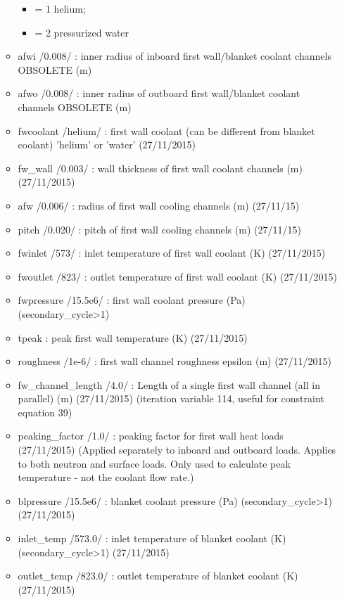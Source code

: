 \documentclass[
]{article}
\providecommand{\tightlist}{%
  \setlength{\itemsep}{0pt}\setlength{\parskip}{0pt}}
\begin{document}
\begin{itemize}
\begin{itemize}
    \begin{itemize}
    \tightlist
    \item
      = 1 helium;
    \item
      = 2 pressurized water
    \end{itemize}
  \item
    afwi /0.008/ : inner radius of inboard first wall/blanket coolant
    channels OBSOLETE (m)
  \item
    afwo /0.008/ : inner radius of outboard first wall/blanket coolant
    channels OBSOLETE (m)
  \item
    fwcoolant /helium/ : first wall coolant (can be different from
    blanket coolant) 'helium' or 'water' (27/11/2015)
  \item
    fw\_wall /0.003/ : wall thickness of first wall coolant channels (m)
    (27/11/2015)
  \item
    afw /0.006/ : radius of first wall cooling channels (m) (27/11/15)
  \item
    pitch /0.020/ : pitch of first wall cooling channels (m) (27/11/15)
  \item
    fwinlet /573/ : inlet temperature of first wall coolant (K)
    (27/11/2015)
  \item
    fwoutlet /823/ : outlet temperature of first wall coolant (K)
    (27/11/2015)
  \item
    fwpressure /15.5e6/ : first wall coolant pressure (Pa)
    (secondary\_cycle\textgreater1)
  \item
    tpeak : peak first wall temperature (K) (27/11/2015)
  \item
    roughness /1e-6/ : first wall channel roughness epsilon (m)
    (27/11/2015)
  \item
    fw\_channel\_length /4.0/ : Length of a single first wall channel
    (all in parallel) (m) (27/11/2015) (iteration variable 114, useful
    for constraint equation 39)
  \item
    peaking\_factor /1.0/ : peaking factor for first wall heat loads
    (27/11/2015) (Applied separately to inboard and outboard loads.
    Applies to both neutron and surface loads. Only used to calculate
    peak temperature - not the coolant flow rate.)
  \item
    blpressure /15.5e6/ : blanket coolant pressure (Pa)
    (secondary\_cycle\textgreater1) (27/11/2015)
  \item
    inlet\_temp /573.0/ : inlet temperature of blanket coolant (K)
    (secondary\_cycle\textgreater1) (27/11/2015)
  \item
    outlet\_temp /823.0/ : outlet temperature of blanket coolant (K)
    (27/11/2015)


\end{itemize}
\end{itemize}
\end{document}
